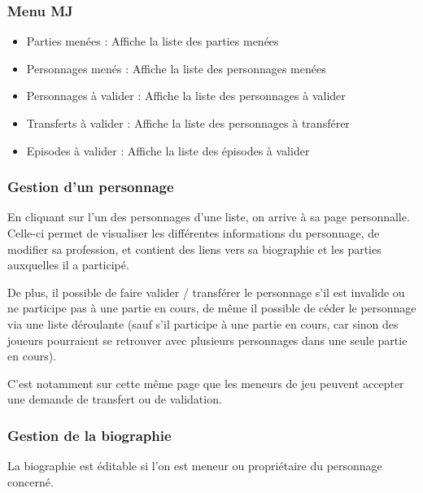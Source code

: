 \documentclass[a4paper, 11pt, titlepage]{article}
\begin{document}
\subsubsection {Menu MJ}

\begin{itemize}
\item
Parties menées : Affiche la liste des parties menées

\item
Personnages menés : Affiche la liste des personnages menées

\item
Personnages à valider : Affiche la liste des personnages à valider

\item
Transferts à valider : Affiche la liste des personnages à transférer

\item
Episodes à valider : Affiche la liste des épisodes à valider

\end{itemize}




\subsubsection {Gestion d'un personnage}

En cliquant sur l'un des personnages d'une liste, on arrive à sa page personnalle. Celle-ci permet de visualiser les différentes informations du personnage, de modifier sa profession, et contient des liens vers sa biographie et les parties auxquelles il a participé.

De plus, il possible de faire valider / transférer le personnage s'il est invalide ou ne participe pas à une partie en cours, de même il possible de céder le personnage via une liste déroulante (sauf s'il participe à une partie en cours, car sinon des joueurs pourraient se retrouver avec plusieurs personnages dans une seule partie en cours).

C'est notamment sur cette même page que les meneurs de jeu peuvent accepter une demande de transfert ou de validation.


\subsubsection {Gestion de la biographie}

La biographie est éditable si l'on est meneur ou propriétaire du personnage concerné.
\end{document}

